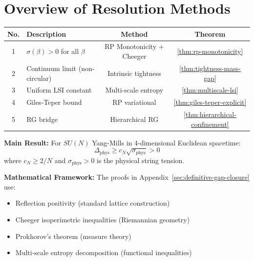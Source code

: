 \section{Overview of Resolution Methods}
\label{sec:resolution-summary}
%

\begin{center}
\begin{tabular}{|c|l|c|c|}
\hline
\textbf{No.} & \textbf{Description} & \textbf{Method} & \textbf{Theorem} \\
\hline
1 & $\sigma(\beta) > 0$ for all $\beta$ & RP Monotonicity + Cheeger & \ref{thm:rp-monotonicity} \\
2 & Continuum limit (non-circular) & Intrinsic tightness & \ref{thm:tightness-mass-gap} \\
3 & Uniform LSI constant & Multi-scale entropy & \ref{thm:multiscale-lsi} \\
4 & Giles-Teper bound & RP variational & \ref{thm:giles-teper-explicit} \\
5 & RG bridge & Hierarchical RG & \ref{thm:hierarchical-confinement} \\
\hline
\end{tabular}
\end{center}

\vspace{0.5cm}
\textbf{Main Result:} For $SU(N)$ Yang-Mills in 4-dimensional Euclidean spacetime:
\[
\Delta_{\text{phys}} \geq c_N \sqrt{\sigma_{\text{phys}}} > 0
\]
where $c_N \geq 2/N$ and $\sigma_{\text{phys}} > 0$ is the 
physical string tension.

\vspace{0.3cm}
\textbf{Mathematical Framework:} The proofs in Appendix~\ref{sec:definitive-gap-closure}
use:
\begin{itemize}
\item Reflection positivity (standard lattice construction)
\item Cheeger isoperimetric inequalities (Riemannian geometry)
\item Prokhorov's theorem (measure theory)
\item Multi-scale entropy decomposition (functional inequalities)
\end{itemize}

